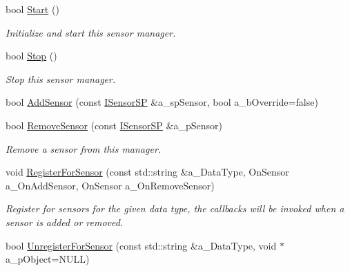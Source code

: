 \begin{DoxyCompactItemize}
bool \hyperlink{class_sensor_manager_a9a26305c41d9a296d8d4d5efc0afa159}{Start} ()
\begin{DoxyCompactList}\small\item\em Initialize and start this sensor manager. \end{DoxyCompactList}\item 
\mbox{\label{class_sensor_manager_a58d0f003e4a7f7869400b23587b71815}} 
bool \hyperlink{class_sensor_manager_a58d0f003e4a7f7869400b23587b71815}{Stop} ()
\begin{DoxyCompactList}\small\item\em Stop this sensor manager. \end{DoxyCompactList}\item 
bool \hyperlink{class_sensor_manager_a68d55cf9952fd77c7977bb5563bf11fe}{Add\+Sensor} (const \hyperlink{class_sensor_manager_a5cd8f6f5dfe0ccc8875ed536ae5df51e}{I\+Sensor\+SP} \&a\+\_\+sp\+Sensor, bool a\+\_\+b\+Override=false)
\item 
\mbox{\label{class_sensor_manager_a8d76b3d96ba46fb80818fc4259bdb66c}} 
bool \hyperlink{class_sensor_manager_a8d76b3d96ba46fb80818fc4259bdb66c}{Remove\+Sensor} (const \hyperlink{class_sensor_manager_a5cd8f6f5dfe0ccc8875ed536ae5df51e}{I\+Sensor\+SP} \&a\+\_\+p\+Sensor)
\begin{DoxyCompactList}\small\item\em Remove a sensor from this manager. \end{DoxyCompactList}\item 
\mbox{\label{class_sensor_manager_a8ef97293847f6eceed9969b2bb74b00c}} 
void \hyperlink{class_sensor_manager_a8ef97293847f6eceed9969b2bb74b00c}{Register\+For\+Sensor} (const std\+::string \&a\+\_\+\+Data\+Type, On\+Sensor a\+\_\+\+On\+Add\+Sensor, On\+Sensor a\+\_\+\+On\+Remove\+Sensor)
\begin{DoxyCompactList}\small\item\em Register for sensors for the given data type, the callbacks will be invoked when a sensor is added or removed. \end{DoxyCompactList}\item 
\mbox{\label{class_sensor_manager_a6759fcc36572574e2c3df1a81a3abc22}} 
bool \hyperlink{class_sensor_manager_a6759fcc36572574e2c3df1a81a3abc22}{Unregister\+For\+Sensor} (const std\+::string \&a\+\_\+\+Data\+Type, void $\ast$a\+\_\+p\+Object=N\+U\+LL)

\end{DoxyCompactItemize}
